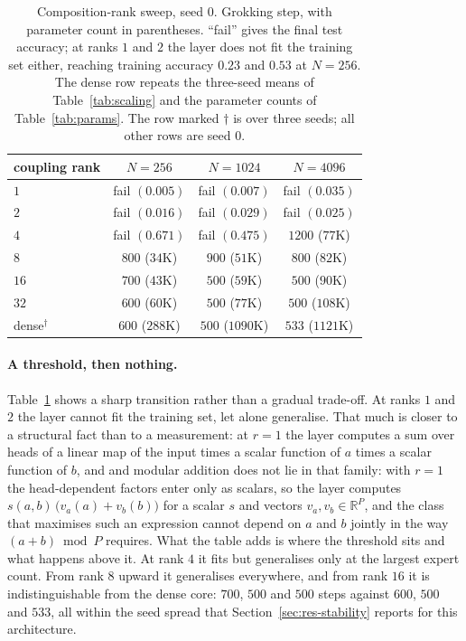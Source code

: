 \begin{table}[ht]
\centering
\caption{Composition-rank sweep, seed $0$. Grokking step, with parameter count
in parentheses. ``fail'' gives the final test accuracy; at ranks $1$ and $2$
the layer does not fit the training set either, reaching training accuracy
$0.23$ and $0.53$ at $N = 256$. The dense row repeats the three-seed means of
Table~\ref{tab:scaling} and the parameter counts of Table~\ref{tab:params}. The row marked $\dagger$ is over three seeds; all other rows are seed $0$.}
\label{tab:comp}
\footnotesize
\begin{tabular}{lccc}
\toprule
coupling rank & $N = 256$ & $N = 1024$ & $N = 4096$ \\
\midrule
$1$     & fail $(0.005)$ & fail $(0.007)$ & fail $(0.035)$ \\
$2$     & fail $(0.016)$ & fail $(0.029)$ & fail $(0.025)$ \\
$4$     & fail $(0.671)$ & fail $(0.475)$ & $1200$ \quad ($77$K) \\
$8$     & $800$ \quad ($34$K) & $900$ \quad ($51$K) & $800$ \quad ($82$K) \\
$16$    & $700$ \quad ($43$K) & $500$ \quad ($59$K) & $500$ \quad ($90$K) \\
$32$    & $600$ \quad ($60$K) & $500$ \quad ($77$K) & $500$ \quad ($108$K) \\
\midrule
dense$^\dagger$ & $600$ \quad ($288$K) & $500$ \quad ($1090$K) & $533$ \quad ($1121$K) \\
\bottomrule
\end{tabular}
\end{table}

\paragraph{A threshold, then nothing.} Table~\ref{tab:comp} shows a sharp
transition rather than a gradual trade-off. At ranks $1$ and $2$ the layer cannot fit the training set, let alone
generalise. That much is closer to a structural fact than to a measurement: at
$r = 1$ the layer computes a sum over heads of a linear map of the input times
a scalar function of $a$ times a scalar function of $b$, and and modular addition does not lie in that family: with $r = 1$ the
head-dependent factors enter only as scalars, so the layer computes
$s(a, b)\,\bigl(v_a(a) + v_b(b)\bigr)$ for a scalar $s$ and vectors
$v_a, v_b \in \mathbb{R}^{P}$, and the class that maximises such an expression
cannot depend on $a$ and $b$ jointly in the way $(a + b) \bmod P$ requires. What the table adds is where the threshold sits
and what happens above it. At rank $4$ it fits but
generalises only at the largest expert count. From rank $8$ upward it
generalises everywhere, and from rank $16$ it is indistinguishable from the
dense core: $700$, $500$ and $500$ steps against $600$, $500$ and $533$, all
within the seed spread that Section~\ref{sec:res-stability} reports for this
architecture.

